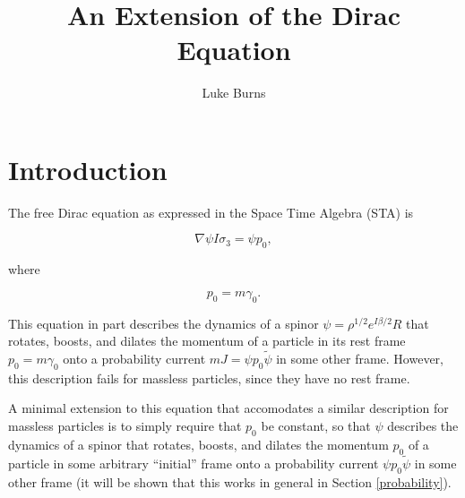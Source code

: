 \documentclass{article}
\title{An Extension of the Dirac Equation}
\author{Luke Burns}
\begin{document}
  \maketitle


  \section{Introduction}

  The free Dirac equation as expressed in the Space Time Algebra (STA) is\cite{gap}

  \begin{equation}
    \nabla \psi I \sigma_3 = \psi p_0, \label{eq:dirac}
  \end{equation}

  where

  \begin{equation}
    p_0 = m \gamma_0. \label{eq:mass}
  \end{equation} 

  This equation in part describes the dynamics of a spinor $\psi = \rho^{1/2} e^{I \beta/2}R$ that rotates, boosts, and dilates the momentum of a particle in its rest frame $p_0 = m \gamma_0$ onto a probability current $mJ = \psi p_0 \widetilde \psi$ in some other frame. However, this description fails for massless particles, since they have no rest frame.

  A minimal extension to this equation that accomodates a similar description for massless particles is to simply require that $p_0$ be constant, so that $\psi$ describes the dynamics of a spinor that rotates, boosts, and dilates the momentum $p_0$ of a particle in some arbitrary ``initial'' frame onto a probability current $\psi p_0 \widetilde \psi$ in some other frame (it will be shown that this works in general in Section \ref{probability}).
\end{document}
